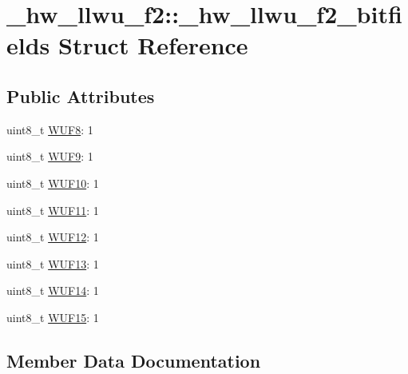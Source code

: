 \hypertarget{struct__hw__llwu__f2_1_1__hw__llwu__f2__bitfields}{}\section{\+\_\+hw\+\_\+llwu\+\_\+f2\+:\+:\+\_\+hw\+\_\+llwu\+\_\+f2\+\_\+bitfields Struct Reference}
\label{struct__hw__llwu__f2_1_1__hw__llwu__f2__bitfields}
\subsection*{Public Attributes}
\begin{DoxyCompactItemize}
\item 
uint8\+\_\+t \hyperlink{struct__hw__llwu__f2_1_1__hw__llwu__f2__bitfields_a9c1dcedec50f772fced12ad75cabed7c}{W\+U\+F8}\+: 1
\item 
uint8\+\_\+t \hyperlink{struct__hw__llwu__f2_1_1__hw__llwu__f2__bitfields_a00dafbf02b05fcefa0e92465bcaf44af}{W\+U\+F9}\+: 1
\item 
uint8\+\_\+t \hyperlink{struct__hw__llwu__f2_1_1__hw__llwu__f2__bitfields_a48cd9cc90a3bd737c3e94d22e8e54dc4}{W\+U\+F10}\+: 1
\item 
uint8\+\_\+t \hyperlink{struct__hw__llwu__f2_1_1__hw__llwu__f2__bitfields_a8e4babad8292d78f82dcd80ff677996d}{W\+U\+F11}\+: 1
\item 
uint8\+\_\+t \hyperlink{struct__hw__llwu__f2_1_1__hw__llwu__f2__bitfields_a76e6c77b7e6b817dfe0fa733f7bc0d9d}{W\+U\+F12}\+: 1
\item 
uint8\+\_\+t \hyperlink{struct__hw__llwu__f2_1_1__hw__llwu__f2__bitfields_a57b28157acdd10dd4f26160c45a18b78}{W\+U\+F13}\+: 1
\item 
uint8\+\_\+t \hyperlink{struct__hw__llwu__f2_1_1__hw__llwu__f2__bitfields_a13e1ae53515a6764c98ed94fea0cc6ff}{W\+U\+F14}\+: 1
\item 
uint8\+\_\+t \hyperlink{struct__hw__llwu__f2_1_1__hw__llwu__f2__bitfields_a7bb001a54cf03b67f5daec309d6b9406}{W\+U\+F15}\+: 1
\end{DoxyCompactItemize}


\subsection{Member Data Documentation}
